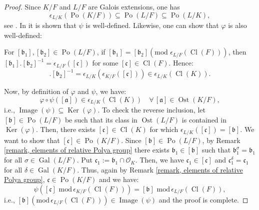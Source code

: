 \documentclass{amsart}
\theoremstyle{definition}
\numberwithin{equation}{section}
\DeclareMathOperator{\Po}{Po}
\DeclareMathOperator{\Ost}{Ost}
\DeclareMathOperator{\Cl}{Cl}
\DeclareMathOperator{\Gal}{Gal}
\DeclareMathOperator{\Ker}{Ker}
\DeclareMathOperator{\Image}{Image}
\begin{document}
\begin{proof}
Since $K/F$ and $L/F$ are Galois extensions, one has
\begin{equation*}
\epsilon_{L/K}(\Po(K/F)) \subseteq \Po(L/F) \subseteq \Po(L/K),
\end{equation*}
see \cite[Lemma 2.10]{MR2}.  In \cite[proof of Theorem 3.14]{SRM} it is shown that $\psi$ is well-defined. Likewise, one can  show that $\varphi$ is also well-defined:

For $[\mathfrak{b}_1], [\mathfrak{b}_2] \in \Po(L/F)$, if $[\mathfrak{b}_1]=[\mathfrak{b}_2] \left( \mathrm{mod}\, \, \epsilon_{L/F}(\Cl(F)) \right) $, then $[\mathfrak{b}_1].[\mathfrak{b}_2]^{-1}=\epsilon_{L/F}([\mathfrak{c}])$ for some $[\mathfrak{c}] \in \Cl(F)$. Hence:
\begin{equation*}
[\mathfrak{b}_1].[\mathfrak{b}_2]^{-1}=\epsilon_{L/K}\left(\epsilon_{K/F}([\mathfrak{c}])\right)  \in \epsilon_{L/K}(\Cl(K)).
\end{equation*}


Now, by definition of $\varphi$ and $\psi$, we have:
\begin{equation*}
\varphi \circ \psi  \left([\mathfrak{a}]\right) \in \epsilon_{L/K}(\Cl(K)) \quad \forall \, [\mathfrak{a}] \in \Ost(K/F),
\end{equation*}
i.e., $\Image(\psi) \subseteq \Ker(\varphi)$. To check the reverse inclusion, let $[\mathfrak{b}] \in \Po(L/F)$ be such that its class in $\Ost(L/F)$ is contained in $\Ker(\varphi)$. Then, there exists $[\mathfrak{c}] \in \Cl(K)$ for which $\epsilon_{L/K}([\mathfrak{c}])=[\mathfrak{b}]$. We want to show that $[\mathfrak{c}] \in \Po(K/F)$. Since $[\mathfrak{b}] \in \Po(L/F)$, by Remark \ref{remark, elements of relative Polya group} there exists $\mathfrak{b}_1 \in [\mathfrak{b}]$ such that $\mathfrak{b}_1^{\sigma} = \mathfrak{b}_1$ for all $\sigma \in \Gal(L/F)$. Put $\mathfrak{c}_1:=\mathfrak{b}_1 \cap \mathcal{O}_K$. Then, we have $\mathfrak{c}_1 \in [\mathfrak{c}]$ and $\mathfrak{c}_1^{\delta} = \mathfrak{c}_1$ for all $\delta \in \Gal(K/F)$. Thus, again by Remark \ref{remark, elements of relative Polya group}, $\mathfrak{c} \in \Po(K/F)$ and we have:
\begin{equation*}
\psi\left([\mathfrak{c}] \, \, \mathrm{mod}\, \epsilon_{K/F}(\Cl(F)) \right)=[\mathfrak{b}] \, \, \mathrm{mod}\, \epsilon_{L/F}(\Cl(F)),
\end{equation*}
i.e., $[\mathfrak{b}]  \left(\mathrm{mod}\, \epsilon_{L/F}(\Cl(F))\right) \in \Image(\psi)$ and the proof is complete.
\end{proof}
\end{document}
